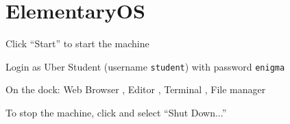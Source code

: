 \documentclass[8pt,a4paper,compress]{beamer}
\newlength{\myMheight}
\begin{document}
\section{ElementaryOS}
\begin{frame}[fragile]
\pause

Click ``Start'' to start the machine

\pause\bigskip

Login as Uber Student (username \lstinline{student}) with password \lstinline{enigma}

\pause\bigskip

\begin{center}
\end{center}

\pause\bigskip

On the dock: Web Browser , Editor , Terminal , File manager 

\pause\bigskip

To stop the machine, click  and select ``Shut Down...''
\end{frame}
\end{document}
